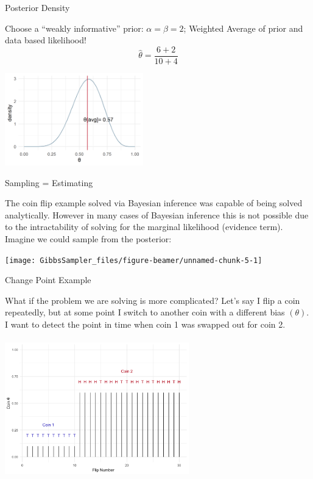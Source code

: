 \documentclass[
  ignorenonframetext,
]{beamer}
\begin{document}
\begin{frame}{Posterior Density}
\protect\hypertarget{posterior-density}{}

Choose a ``weakly informative'' prior: \(\alpha=\beta=2\); Weighted
Average of prior and data based likelihood!
\[\hat{\theta} = \frac{6+2}{10+4}\]

\begin{center}\includegraphics[width=6cm,height=4cm]{figures/PosteriorBeta} \end{center}

\end{frame}

\begin{frame}{Sampling = Estimating}
\protect\hypertarget{sampling-estimating}{}

The coin flip example solved via Bayesian inference was capable of being
solved analytically. However in many cases of Bayesian inference this is
not possible due to the intractability of solving for the marginal
likelihood (evidence term). Imagine we could sample from the posterior:

\begin{center}\texttt{[image: GibbsSampler\_files/figure-beamer/unnamed-chunk-5-1]} \end{center}

\end{frame}

\begin{frame}{Change Point Example}
\protect\hypertarget{change-point-example}{}

\footnotesize

What if the problem we are solving is more complicated? Let's say I flip
a coin repeatedly, but at some point I switch to another coin with a
different bias \((\theta)\). I want to detect the point in time when
coin 1 was swapped out for coin 2.

\begin{center}\includegraphics[width=8cm,height=6cm]{figures/ldaFig2_15_bernChangePointExampleFig-1} \end{center}

\end{frame}
\end{document}
